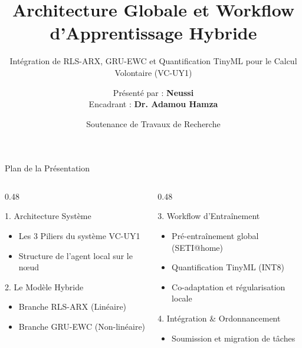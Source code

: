 \documentclass[10pt,aspectratio=169]{beamer}
\title[Architecture \& Workflow VC-UY1]{Architecture Globale et Workflow d'Apprentissage Hybride}
\subtitle{Intégration de RLS-ARX, GRU-EWC et Quantification TinyML pour le Calcul Volontaire (VC-UY1)}
\author[Mémoire de Master 2]{Présenté par : \textbf{Neussi} \\[0.5em] \small Encadrant : \textbf{Dr. Adamou Hamza}}
\institute[UY1]{Université de Yaoundé I \\ Département d'Informatique \\ Spécialité : Systèmes et Réseaux}
\date[Juin 2026]{Soutenance de Travaux de Recherche}
\begin{document}
\begin{frame}
  \titlepage
\end{frame}

\begin{frame}{Plan de la Présentation}
  \begin{columns}[T]
    \begin{column}{0.48\textwidth}
      \begin{block}{1. Architecture Système}
        \begin{itemize}
          \item Les 3 Piliers du système VC-UY1
          \item Structure de l'agent local sur le nœud
        \end{itemize}
      \end{block}
      
      \begin{block}{2. Le Modèle Hybride}
        \begin{itemize}
          \item Branche RLS-ARX (Linéaire)
          \item Branche GRU-EWC (Non-linéaire)
        \end{itemize}
      \end{block}
    \end{column}
    
    \begin{column}{0.48\textwidth}
      \begin{block}{3. Workflow d'Entraînement}
        \begin{itemize}
          \item Pré-entraînement global (SETI@home)
          \item Quantification TinyML (INT8)
          \item Co-adaptation et régularisation locale
        \end{itemize}
      \end{block}
      
      \begin{block}{4. Intégration \& Ordonnancement}
        \begin{itemize}
          \item Soumission et migration de tâches
        \end{itemize}
      \end{block}
    \end{column}
  \end{columns}
\end{frame}
\end{document}
